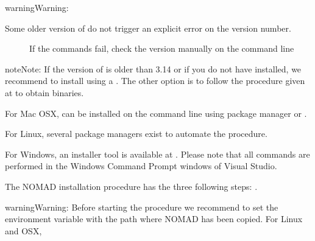 \documentclass[letterpaper,10pt,english]{sphinxmanual}
\begin{document}
\begin{sphinxadmonition}{warning}{Warning:}\begin{description}
\item[{Some older version of  do not trigger an explicit error on the version number.}] \leavevmode
\sphinxAtStartPar
If the  commands fail, check the version manually on the command line

\end{description}

\begin{sphinxVerbatim}[commandchars=\\\{\}]
 
\end{sphinxVerbatim}

\sphinxAtStartPar
{}
\end{sphinxadmonition}

\begin{sphinxadmonition}{note}{Note:}
\sphinxAtStartPar
If the version of  is older than 3.14 or if you do not have  installed,
we recommend to install  using a . The other option is to
follow the procedure given at  to obtain binaries.

\sphinxAtStartPar
For Mac OSX,  can be installed on the command line using package manager  or .

\sphinxAtStartPar
For Linux, several package managers exist to automate the procedure.

\sphinxAtStartPar
For Windows, an installer tool is available at . Please note that all commands are performed in the Windows Command Prompt windows of Visual Studio.
\end{sphinxadmonition}

\sphinxAtStartPar
The NOMAD installation procedure has the three following steps: .

\begin{sphinxadmonition}{warning}{Warning:}
\sphinxAtStartPar
Before starting the procedure we recommend to set the environment variable  with the path where NOMAD has been copied. For Linux and OSX,

\begin{sphinxVerbatim}[commandchars=\\\{\}]
 
\end{sphinxVerbatim}
\end{sphinxadmonition}
\end{document}
